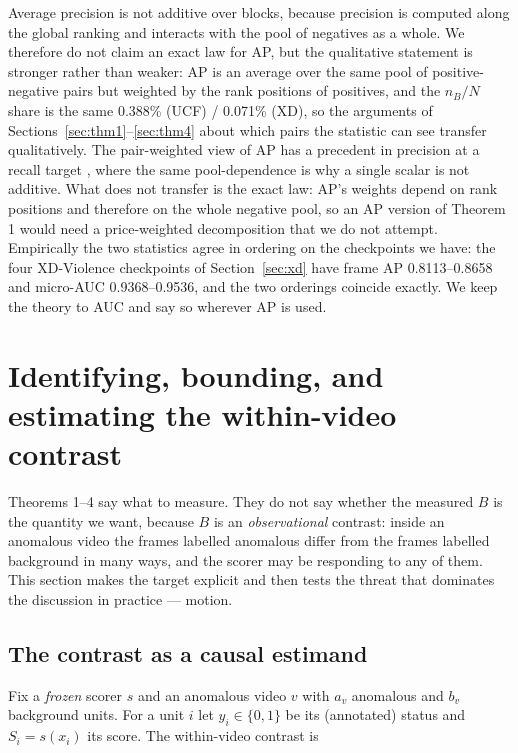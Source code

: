 \documentclass[number,preprint,12pt]{elsarticle}
\begin{document}
Average precision is not additive over blocks, because precision is computed
along the global ranking and interacts with the pool of negatives as a whole. We
therefore do not claim an exact law for AP, but the qualitative statement is
stronger rather than weaker: AP is an average over the same pool of
positive-negative pairs but weighted by the rank positions of positives, and the
\(n_B/N\) share is the same 0.388\% (UCF) / 0.071\% (XD), so the arguments of
Sections~\ref{sec:thm1}--\ref{sec:thm4} about which pairs the statistic can see transfer qualitatively. The
pair-weighted view of AP has a precedent in precision at a recall target
\citep{tatbul2018precision}, where the same pool-dependence is why a single
scalar is not additive. What
does not transfer is the exact law: AP's weights depend on rank positions and
therefore on the whole negative pool, so an AP version of Theorem 1 would need a
price-weighted decomposition that we do not attempt. Empirically the two
statistics agree in ordering on the checkpoints we have: the four XD-Violence
checkpoints of Section~\ref{sec:xd} have frame AP 0.8113--0.8658 and micro-AUC 0.9368--0.9536, and
the two orderings coincide exactly. We keep the theory to AUC and say so
wherever AP is used.

\section{Identifying, bounding, and estimating the within-video contrast}\label{sec:contrast}

Theorems 1--4 say what to measure. They do not say whether the measured \(B\) is
the quantity we want, because \(B\) is an \emph{observational} contrast: inside an
anomalous video the frames labelled anomalous differ from the frames labelled
background in many ways, and the scorer may be responding to any of them. This
section makes the target explicit and then tests the threat that dominates the
discussion in practice --- motion.

\subsection{The contrast as a causal estimand}\label{sec:causal}

Fix a \emph{frozen} scorer \(s\) and an anomalous video \(v\) with \(a_v\) anomalous and
\(b_v\) background units. For a unit \(i\) let \(y_i\in\{0,1\}\) be its (annotated)
status and \(S_i=s(x_i)\) its score. The within-video contrast is
\end{document}
